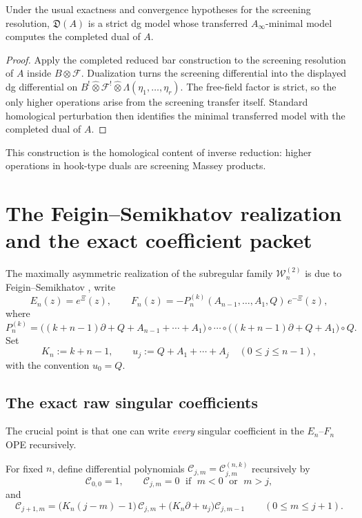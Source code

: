 \begin{proposition}
\label{prop:screening-fiber-dual}
Under the usual exactness and convergence hypotheses for the screening
resolution, $\mathfrak D(A)$ is a strict dg model whose transferred
$A_\infty$-minimal model computes the completed dual of $A$.
\end{proposition}

\begin{proof}
Apply the completed reduced bar construction to the screening resolution of
$A$ inside $B\otimes \mathcal F$.  Dualization turns the screening differential
into the displayed dg differential on
$B^!\widehat\otimes \mathcal F^! \widehat\otimes \Lambda(\eta_1,\dots,\eta_r)$.
The free-field factor is strict, so the only higher operations arise from the
screening transfer itself.  Standard homological perturbation then identifies the
minimal transferred model with the completed dual of $A$.
\end{proof}

This construction is the homological content of inverse reduction: higher
operations in hook-type duals are screening Massey products.

\section{The Feigin--Semikhatov realization and the exact coefficient packet}

The maximally asymmetric realization of the subregular family
$\mathcal W_n^{(2)}$ is due to Feigin--Semikhatov
\cite{FeiginSemikhatov}, write
\[
E_n(z)=e^{\Xi}(z),
\qquad
F_n(z)=-P_n^{(k)}(A_{n-1},\dots,A_1,Q)\,e^{-\Xi}(z),
\]
where
\[
P_n^{(k)}
=
\bigl((k+n-1)\partial + Q+A_{n-1}+\cdots+A_1\bigr)\circ\cdots\circ
\bigl((k+n-1)\partial + Q+A_1\bigr)\circ Q.
\]
Set
\[
K_n:=k+n-1,
\qquad
u_j:=Q+A_1+\cdots+A_j
\quad (0\leq j\leq n-1),
\]
with the convention $u_0=Q$.

\subsection{The exact raw singular coefficients}

The crucial point is that one can write \emph{every} singular coefficient in
the $E_n$--$F_n$ OPE recursively.

\begin{definition}
\label{def:raw-coefficient-operators}
For fixed $n$, define differential polynomials
$\mathcal C_{j,m}=\mathcal C_{j,m}^{(n,k)}$ recursively by
\[
\mathcal C_{0,0}=1,
\qquad
\mathcal C_{j,m}=0 \;\text{ if }\; m<0 \;\text{ or }\; m>j,
\]
and
\[
\mathcal C_{j+1,m}
=
\bigl(K_n(j-m)-1\bigr)\,\mathcal C_{j,m}
+
\bigl(K_n\partial + u_j\bigr)\mathcal C_{j,m-1}
\qquad
(0\leq m\leq j+1).
\]
\end{definition}

